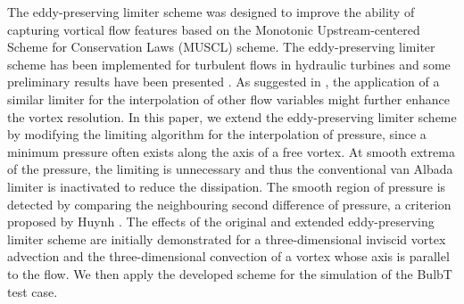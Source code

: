 The eddy-preserving limiter scheme \cite{mohamed2012eddy} was designed to improve the ability of capturing vortical flow features based on the Monotonic Upstream-centered Scheme for Conservation Laws (MUSCL) scheme. The eddy-preserving limiter scheme has been implemented for turbulent flows in hydraulic turbines and some preliminary results have been presented \cite{yang2016low}. As suggested in \cite{mohamed2012eddy}, the application of a similar limiter for the interpolation of other flow variables might further enhance the vortex resolution. In this paper, we extend the eddy-preserving limiter scheme by modifying the limiting algorithm for the interpolation of pressure, since a minimum pressure often exists along the axis of a free vortex. At smooth extrema of the pressure, the limiting is unnecessary and thus the conventional van Albada limiter is inactivated to reduce the dissipation. The smooth region of pressure is detected by comparing the neighbouring second difference of pressure, a criterion proposed by Huynh \cite{huynh1995accurate}. The effects of the original and extended eddy-preserving limiter scheme are initially demonstrated for a three-dimensional inviscid vortex advection and the three-dimensional convection of a vortex whose axis is parallel to the flow. We then apply the developed scheme for the simulation of the BulbT test case.